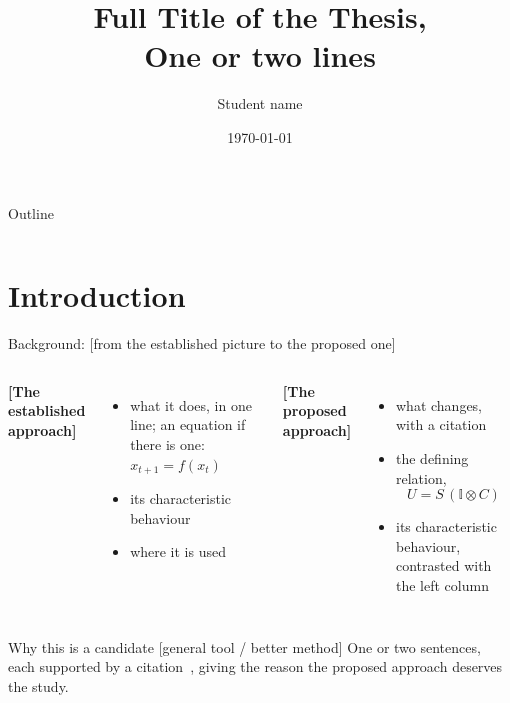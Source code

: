 \documentclass[aspectratio=43, 11pt, xcolor=dvipsnames, compress]{beamer}
\title[Short title]{Full Title of the Thesis,\\One or two lines}
\author[Student name]{Student name}
\institute[SNS, NUST]{School of Natural Sciences, NUST}
\date{\today}
\renewcommand{\cite}[2][]{\unskip}   %
\begin{document}
\begin{frame}[plain]
  \titlepage
\end{frame}

\begin{frame}{Outline}
  \small
  \begin{columns}[T]
      \tableofcontents[sections={1-5}]
      \tableofcontents[sections={6-10}]
  \end{columns}
\end{frame}

\section{Introduction}

\begin{frame}{Background: [from the established picture to the proposed one]}
  \small
  \begin{columns}[T]
      \textbf{[The established approach]}
      \begin{itemize}
        \item what it does, in one line; an equation if there is one: $x_{t+1} = f(x_t)$
        \item its characteristic behaviour
        \item where it is used
      \end{itemize}
      \textbf{[The proposed approach]}
      \begin{itemize}
        \item what changes, with a citation~\cite{example_article}
        \item the defining relation,
          \[ U = S\,(\mathbb{I}\otimes C) \]
        \item its characteristic behaviour, contrasted with the left column
      \end{itemize}
  \end{columns}
  \vskip0.3cm
  \begin{block}{Why this is a candidate [general tool / better method]}
    One or two sentences, each supported by a citation~\cite{example_book, example_inproceedings}, giving the reason the proposed approach deserves the study.
  \end{block}
\end{frame}
\end{document}
